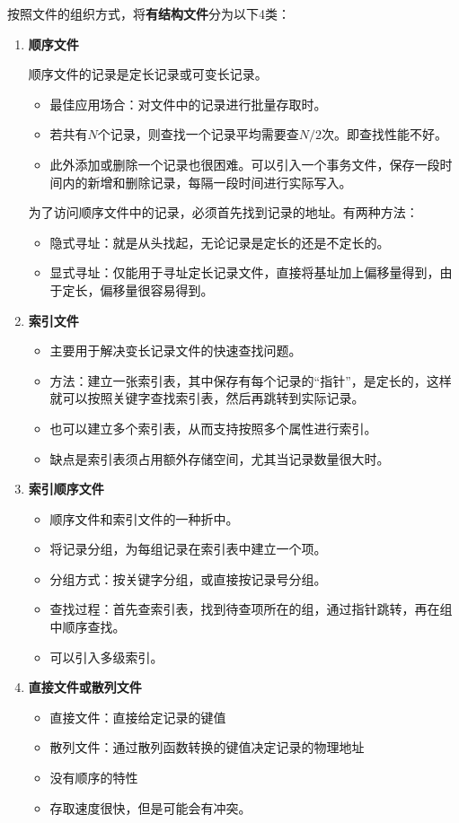 \documentclass[12pt, a4paper, oneside]{ctexart}
\begin{document}
按照文件的组织方式，将\textbf{有结构文件}分为以下4类：
\begin{enumerate}
  \item {\bf 顺序文件}
  
  顺序文件的记录是定长记录或可变长记录。
  \begin{itemize}
    \item 最佳应用场合：对文件中的记录进行批量存取时。
    \item 若共有$N$个记录，则查找一个记录平均需要查$N/2$次。即查找性能不好。
    \item 此外添加或删除一个记录也很困难。可以引入一个事务文件，保存一段时间内的新增和删除记录，每隔一段时间进行实际写入。
  \end{itemize}

  为了访问顺序文件中的记录，必须首先找到记录的地址。有两种方法：
  \begin{itemize}
    \item 隐式寻址：就是从头找起，无论记录是定长的还是不定长的。
    \item 显式寻址：仅能用于寻址定长记录文件，直接将基址加上偏移量得到，由于定长，偏移量很容易得到。
  \end{itemize}
  \item {\bf 索引文件}
  \begin{itemize}
    \item 主要用于解决变长记录文件的快速查找问题。
    \item 方法：建立一张索引表，其中保存有每个记录的“指针”，是定长的，这样就可以按照关键字查找索引表，然后再跳转到实际记录。
    \item 也可以建立多个索引表，从而支持按照多个属性进行索引。
    \item 缺点是索引表须占用额外存储空间，尤其当记录数量很大时。
  \end{itemize}
  \item {\bf 索引顺序文件}
  \begin{itemize}
    \item 顺序文件和索引文件的一种折中。
    \item 将记录分组，为每组记录在索引表中建立一个项。
    \item 分组方式：按关键字分组，或直接按记录号分组。
    \item 查找过程：首先查索引表，找到待查项所在的组，通过指针跳转，再在组中顺序查找。
    \item 可以引入多级索引。
  \end{itemize}
  \item {\bf 直接文件或散列文件}
  \begin{itemize}
    \item 直接文件：直接给定记录的键值
    \item 散列文件：通过散列函数转换的键值决定记录的物理地址
    \item 没有顺序的特性
    \item 存取速度很快，但是可能会有冲突。
  \end{itemize}
\end{enumerate}
\end{document}
